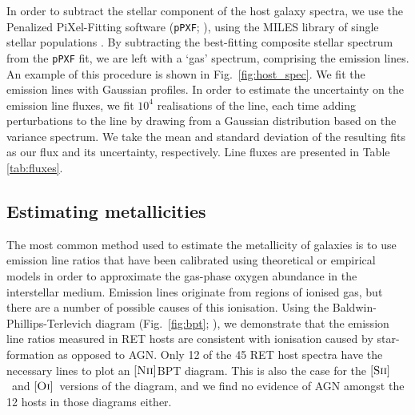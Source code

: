 \documentclass[fleqn,usenatbib,]{mnras}
\newcommand{\OI}[0]{$[\textnormal{\textsc{Oi}}]$}
\newcommand{\SII}[0]{$[\textnormal{\textsc{Sii}}]$}
\newcommand{\NII}[0]{$[\textnormal{\textsc{Nii}}]$}
\begin{document}
In order to subtract the stellar component of the host galaxy spectra, we use the Penalized PiXel-Fitting software (\texttt{pPXF}; \citealt{Cappellari2004,Cappellari2012,Cappellari2017}), using the MILES library of single stellar populations \citep{Vazdekis2010}. By subtracting the best-fitting composite stellar spectrum from the \texttt{pPXF} fit, we are left with a `gas' spectrum, comprising the emission lines. An example of this procedure is shown in Fig.~\ref{fig:host_spec}. We fit the emission lines with Gaussian profiles. In order to estimate the uncertainty on the emission line fluxes, we fit $10^4$ realisations of the line, each time adding perturbations to the line by drawing from a Gaussian distribution based on the variance spectrum. We take the mean and standard deviation of the resulting fits as our flux and its uncertainty, respectively. Line fluxes are presented in Table \ref{tab:fluxes}.

\subsection{Estimating metallicities \label{subsec:calc_Z}}

The most common method used to estimate the metallicity of galaxies is to use emission line ratios that have been calibrated using theoretical or empirical models in order to approximate the gas-phase oxygen abundance in the interstellar medium. Emission lines originate from regions of ionised gas, but there are a number of possible causes of this ionisation. Using the Baldwin-Phillips-Terlevich diagram (Fig.~\ref{fig:bpt}; \citealt{Baldwin1981}), we demonstrate that the emission line ratios measured in RET hosts are consistent with ionisation caused by star-formation as opposed to AGN. Only 12 of the 45 RET host spectra have the necessary lines to plot an \NII BPT diagram. This is also the case for the \SII~and \OI~versions of the diagram, and we find no evidence of AGN amongst the 12 hosts in those diagrams either.
\end{document}
